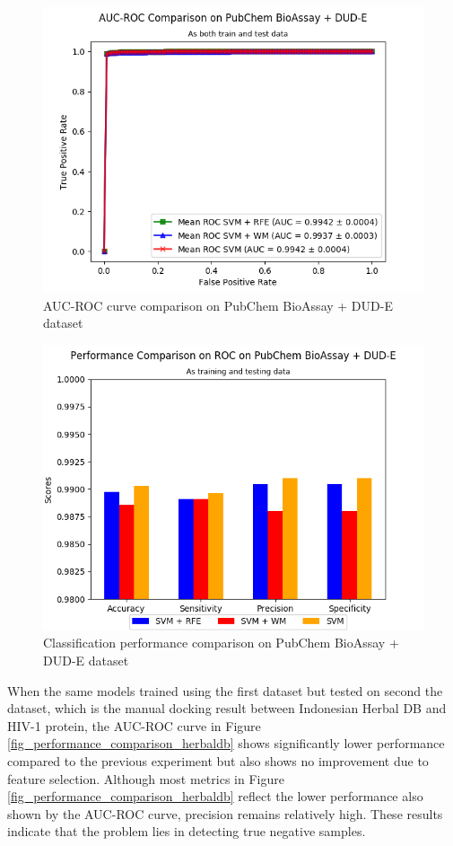 \documentclass[conference]{IEEEtran}
\begin{document}
\begin{figure}
	\centering	
	\includegraphics[scale=0.45]{../images/03-evaluate-1_roc_chart.png}
	\caption{AUC-ROC curve comparison on PubChem BioAssay + DUD-E dataset}
	\label{fig_roc_comparison_pubchem}
\end{figure}

\begin{figure}
	\centering	
	\includegraphics[scale=0.45]{../images/03-evaluate-1_scores_chart.png}
	\caption{Classification performance comparison on PubChem BioAssay + DUD-E dataset}
	\label{fig_performance_comparison_pubchem}
\end{figure}

When the same models trained using the first dataset but tested on second the dataset, which is the manual docking result between Indonesian Herbal DB and HIV-1 protein, the AUC-ROC curve in Figure \ref{fig_performance_comparison_herbaldb} shows significantly lower performance compared to the previous experiment but also shows no improvement due to feature selection. Although most metrics in Figure \ref{fig_performance_comparison_herbaldb} reflect the lower performance also shown by the AUC-ROC curve, precision remains relatively high. These results indicate that the problem lies in detecting true negative samples.
\end{document}
